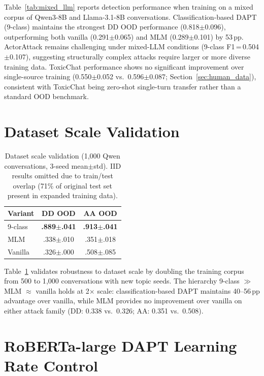 Table~\ref{tab:mixed_llm} reports detection performance when training on a mixed corpus of Qwen3-8B and Llama-3.1-8B conversations. Classification-based DAPT (9-class) maintains the strongest DD OOD performance (0.818$\pm$0.096), outperforming both vanilla (0.291$\pm$0.065) and MLM (0.289$\pm$0.101) by 53\,pp. ActorAttack remains challenging under mixed-LLM conditions (9-class F1\,=\,0.504$\pm$0.107), suggesting structurally complex attacks require larger or more diverse training data. ToxicChat performance shows no significant improvement over single-source training (0.550$\pm$0.052 vs.\ 0.596$\pm$0.087; Section~\ref{sec:human_data}), consistent with ToxicChat being zero-shot single-turn transfer rather than a standard OOD benchmark.

\section{Dataset Scale Validation}
\label{app:scale_validation}

\begin{table}[ht]
\centering
\footnotesize
\caption{Dataset scale validation (1{,}000 Qwen conversations, 3-seed mean$\pm$std). IID results omitted due to train/test overlap (71\% of original test set present in expanded training data).}
\label{tab:scale_validation}
\begin{tabular}{@{}lcc@{}}
\toprule
\textbf{Variant} & DD OOD & AA OOD \\
\midrule
9-class & \textbf{.889$\pm$.041} & \textbf{.913$\pm$.041} \\
MLM & .338$\pm$.010 & .351$\pm$.018 \\
Vanilla & .326$\pm$.000 & .508$\pm$.085 \\
\bottomrule
\end{tabular}
\end{table}

Table~\ref{tab:scale_validation} validates robustness to dataset scale by doubling the training corpus from 500 to 1{,}000 conversations with new topic seeds. The hierarchy 9-class $\gg$ MLM $\approx$ vanilla holds at 2$\times$ scale: classification-based DAPT maintains 40--56\,pp advantage over vanilla, while MLM provides no improvement over vanilla on either attack family (DD: 0.338 vs.\ 0.326; AA: 0.351 vs.\ 0.508).

\section{RoBERTa-large DAPT Learning Rate Control}

